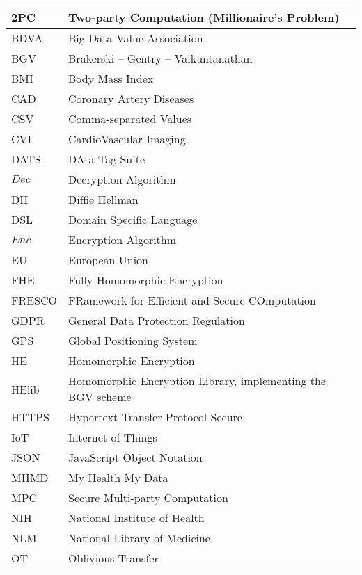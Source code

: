 \abbreviations
\begin{center}
	\renewcommand{\arraystretch}{1.5}
	\begin{longtable}{| l @{\qquad} | l |}
	\hline
	2PC       & Two-party Computation (Millionaire's Problem) \\ \hline
	BDVA 			& Big Data Value Association \\ \hline
	BGV       & Brakerski -- Gentry -- Vaikuntanathan \\ \hline
	BMI       & Body Mass Index \\ \hline
	CAD 			& Coronary Artery Diseases \\ \hline
	CSV 			& Comma-separated Values \\ \hline
	CVI 			& CardioVascular Imaging \\ \hline
	DATS 			& DAta Tag Suite \\ \hline
	$Dec$     & Decryption Algorithm \\ \hline
	DH				& Diffie Hellman \\ \hline
	DSL       & Domain Specific Language \\ \hline
	$Enc$     & Encryption Algorithm \\ \hline
	EU				& European Union \\ \hline
	FHE       & Fully Homomorphic Encryption \\ \hline
	FRESCO  	& FRamework for Efficient and Secure COmputation \\ \hline
	GDPR 			& General Data Protection Regulation \\ \hline
	GPS 			& Global Positioning System \\ \hline
	HE        & Homomorphic Encryption \\ \hline
	HElib     & Homomorphic Encryption Library, implementing the BGV scheme \\ \hline
	HTTPS 		& Hypertext Transfer Protocol Secure \\ \hline
	IoT				& Internet of Things \\ \hline
	JSON 			& JavaScript Object Notation \\ \hline
	MHMD 			& My Health My Data \\ \hline
	MPC 			& Secure Multi-party Computation \\ \hline
	NIH 			& National Institute of Health \\ \hline
	NLM 			& National Library of Medicine \\ \hline
	OT        & Oblivious Transfer \\ \hline

\end{longtable}
\end{center}
